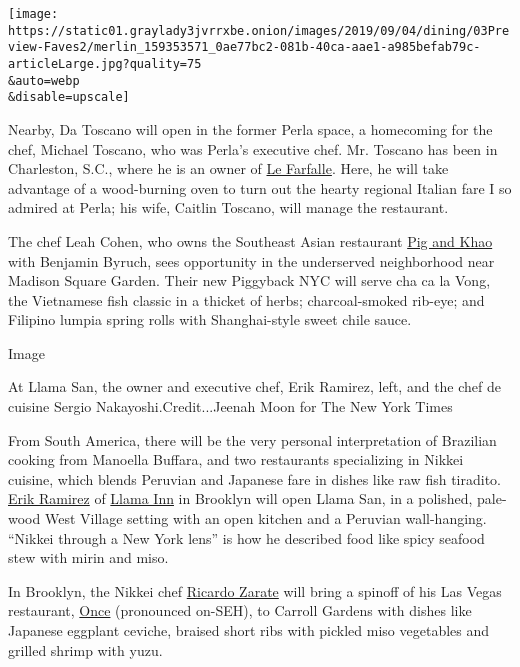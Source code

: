 \texttt{[image: https://static01.graylady3jvrrxbe.onion/images/2019/09/04/dining/03Preview-Faves2/merlin\_159353571\_0ae77bc2-081b-40ca-aae1-a985befab79c-articleLarge.jpg?quality=75\\\&auto=webp\\\&disable=upscale]}

Nearby, Da Toscano will open in the former Perla space, a homecoming for
the chef, Michael Toscano, who was Perla's executive chef. Mr. Toscano
has been in Charleston, S.C., where he is an owner of
\href{https://charlestonwineandfood.com/participants/michael-toscano/}{Le
Farfalle}. Here, he will take advantage of a wood-burning oven to turn
out the hearty regional Italian fare I so admired at Perla; his wife,
Caitlin Toscano, will manage the restaurant.

The chef Leah Cohen, who owns the Southeast Asian restaurant
\href{https://www.nytimes3xbfgragh.onion/2013/03/13/dining/reviews/restaurant-review-jeepney-in-the-east-village-pig-and-khao-on-the-lower-east-side.html}{Pig
and Khao} with Benjamin Byruch, sees opportunity in the underserved
neighborhood near Madison Square Garden. Their new Piggyback NYC will
serve cha ca la Vong, the Vietnamese fish classic in a thicket of herbs;
charcoal-smoked rib-eye; and Filipino lumpia spring rolls with
Shanghai-style sweet chile sauce.

Image

At Llama San, the owner and executive chef, Erik Ramirez, left, and the
chef de cuisine Sergio Nakayoshi.Credit...Jeenah Moon for The New York
Times

From South America, there will be the very personal interpretation of
Brazilian cooking from Manoella Buffara, and two restaurants
specializing in Nikkei cuisine, which blends Peruvian and Japanese fare
in dishes like raw fish tiradito.
\href{https://www.pannacooking.com/chefs/erik-ramirez/}{Erik Ramirez} of
\href{https://www.nytimes3xbfgragh.onion/2016/02/10/dining/llama-inn-review.html}{Llama
Inn} in Brooklyn will open Llama San, in a polished, pale-wood West
Village setting with an open kitchen and a Peruvian wall-hanging.
``Nikkei through a New York lens'' is how he described food like spicy
seafood stew with mirin and miso.

In Brooklyn, the Nikkei chef
\href{https://www.ricardomzarate.com/}{Ricardo Zarate} will bring a
spinoff of his Las Vegas restaurant,
\href{https://www.oncelv.com/}{Once} (pronounced on-SEH), to Carroll
Gardens with dishes like Japanese eggplant ceviche, braised short ribs
with pickled miso vegetables and grilled shrimp with yuzu.

